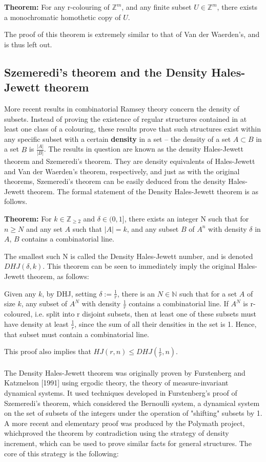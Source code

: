\documentclass[11pt,a4paper]{article}
\begin{document}
\textbf{Theorem:} For any r-colouring of $\mathbb{Z}^m$, and any finite subset $U \in \mathbb{Z}^m$, there exists a monochromatic homothetic copy of $U$.

The proof of this theorem is extremely similar to that of Van der Waerden's, and is thus left out.


\subsection{Szemeredi's theorem and the Density Hales-Jewett theorem}
More recent results in combinatorial Ramsey theory concern the density of subsets. Instead of proving the existence of regular structures contained in at least one class of a colouring, these results prove that such structures exist within any specific subset with a certain \textbf{density} in a set -- the density of a set $A \subset B$ in a set $B$ is $\frac{|A|}{|B|}$. The results in question are known as the density Hales-Jewett theorem and Szemeredi's theorem. They are density equivalents of Hales-Jewett and Van der Waerden's theorem, respectively, and just as with the original theorems, Szemeredi's theorem can be easily deduced from the density Hales-Jewett theorem. The formal statement of the Density Hales-Jewett theorem is as follows.

\textbf{Theorem:} For $k \in \mathbb{Z}_{\geq 2}$ and $\delta \in (0, 1]$, there exists an integer N such that for $n \geq N$ and any set $A$ such that $|A| = k$, and any subset $B$ of $A^n$ with density $\delta$ in $A$, $B$ contains a combinatorial line.

The smallest such N is called the Density Hales-Jewett number, and is denoted $DHJ(\delta, k)$. This theorem can be seen to immediately imply the original Hales-Jewett theorem, as follows:

Given any $k$, by DHJ, setting $\delta := \frac{1}{r}$, there is an $N \in \mathbb{N}$ such that for a set $A$ of size $k$, any subset of $A^N$ with density $\frac{1}{r}$ contains a combinatorial line. If $A^N$ is r-coloured, i.e. split into r disjoint subsets, then at least one of these subsets must have density at least $\frac{1}{r}$, since the sum of all their densities in the set is 1. Hence, that subset must contain a combinatorial line.

This proof also implies that $HJ(r, n) \leq DHJ(\frac{1}{r}, n)$.

\paragraph*{}
The Density Hales-Jewett theorem was originally proven by Furstenberg and Katznelson [1991] using ergodic theory, the theory of measure-invariant dynamical systems. It used techniques developed in Furstenberg's proof of Szemeredi's theorem, which considered the Bernoulli system, a dynamical system on the set of subsets of the integers under the operation of "shifting" subsets by 1. A more recent and elementary proof was produced by the Polymath project, whichproved the theorem by contradiction using the strategy of density increment, which can be used to prove similar facts for general structures. The core of this strategy is the following:
\end{document}
